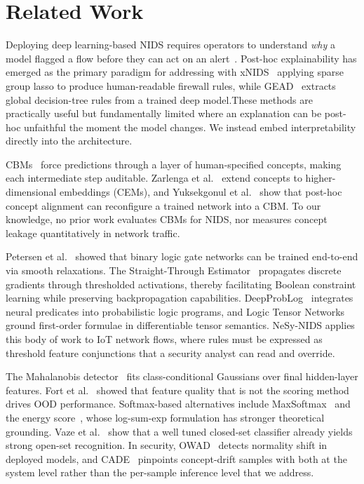 \documentclass[journal]{IEEEtran}
\begin{document}
\section{Related Work}

Deploying deep learning-based NIDS requires operators to understand \emph{why} a model flagged a flow before they can act on an alert~\cite{rudin2019stop,arp2022dos}. Post-hoc explainability has emerged as the primary paradigm for addressing with xNIDS~\cite{wei2023xnids} applying sparse group lasso to produce human-readable firewall rules, while GEAD~\cite{han2024gead} extracts global decision-tree rules from a trained deep model.These methods are practically useful but fundamentally limited where an explanation can be post-hoc unfaithful the moment the model changes. We instead embed interpretability directly into the architecture.

CBMs~\cite{koh2020concept} force predictions through a layer of human-specified concepts, making each intermediate step auditable. Zarlenga et al.~\cite{zarlenga2022concept} extend concepts to higher-dimensional embeddings (CEMs), and Yuksekgonul et al.~\cite{yuksekgonul2023posthoc} show that post-hoc concept alignment can reconfigure a trained network into a CBM. To our knowledge, no prior work evaluates CBMs for NIDS, nor measures concept leakage quantitatively in network traffic.

Petersen et al.~\cite{petersen2022logic} showed that binary logic gate networks can be trained end-to-end via smooth relaxations. The Straight-Through Estimator~\cite{yang2022ste} propagates discrete gradients through thresholded activations, thereby facilitating Boolean constraint learning while preserving backpropagation capabilities. DeepProbLog~\cite{manhaeve2021deepproblog} integrates neural predicates into probabilistic logic programs, and Logic Tensor Networks~\cite{badreddine2022ltn} ground first-order formulae in differentiable tensor semantics. NeSy-NIDS applies this body of work to IoT network flows, where rules must be expressed as threshold feature conjunctions that a security analyst can read and override.

The Mahalanobis detector~\cite{lee2018simple} fits class-conditional Gaussians over final hidden-layer features. Fort et al.~\cite{fort2021exploring} showed that feature quality that is not the scoring method drives OOD performance. Softmax-based alternatives include MaxSoftmax~\cite{hendrycks2017baseline} and the energy score~\cite{liu2020energy}, whose log-sum-exp formulation has stronger theoretical grounding. Vaze et al.~\cite{vaze2022openset} show that a well tuned closed-set classifier already yields strong open-set recognition. In security, OWAD~\cite{han2023owad} detects normality shift in deployed models, and CADE~\cite{yang2021cade} pinpoints concept-drift samples with both at the system level rather than the per-sample inference level that we address.
\end{document}
